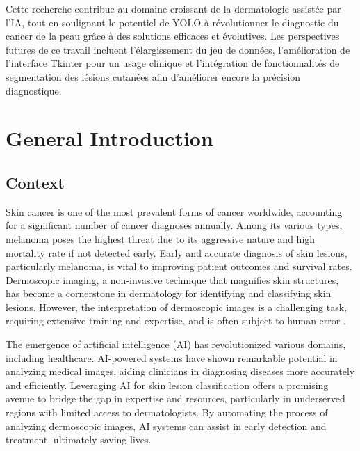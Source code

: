 \documentclass[a4paper,12pt]{report}
\begin{document}
\begin{spacing}{1.5}
    Cette recherche contribue au domaine croissant de la dermatologie assistée par l'IA, tout en soulignant le potentiel de YOLO à révolutionner le diagnostic du cancer de la peau grâce à des solutions efficaces et évolutives. Les perspectives futures de ce travail incluent l'élargissement du jeu de données, l'amélioration de l'interface Tkinter pour un usage clinique et l'intégration de fonctionnalités de segmentation des lésions cutanées afin d'améliorer encore la précision diagnostique.
    
\tableofcontents
\listoffigures
\listoftables


\chapter{General Introduction}
    \section{Context}
    Skin cancer is one of the most prevalent forms of cancer worldwide, accounting for a significant number of cancer diagnoses annually. Among its various types, melanoma poses the highest threat due to its aggressive nature and high mortality rate if not detected early. Early and accurate diagnosis of skin lesions, particularly melanoma, is vital to improving patient outcomes and survival rates. Dermoscopic imaging, a non-invasive technique that magnifies skin structures, has become a cornerstone in dermatology for identifying and classifying skin lesions. However, the interpretation of dermoscopic images is a challenging task, requiring extensive training and expertise, and is often subject to human error \cite{intro1}\cite{intro2}.
    
    The emergence of artificial intelligence (AI) has revolutionized various domains, including healthcare. AI-powered systems have shown remarkable potential in analyzing medical images, aiding clinicians in diagnosing diseases more accurately and efficiently. Leveraging AI for skin lesion classification offers a promising avenue to bridge the gap in expertise and resources, particularly in underserved regions with limited access to dermatologists. By automating the process of analyzing dermoscopic images, AI systems can assist in early detection and treatment, ultimately saving lives\cite{intro3}\cite{intro4}.
    \newpage


\end{spacing}
\end{document}
